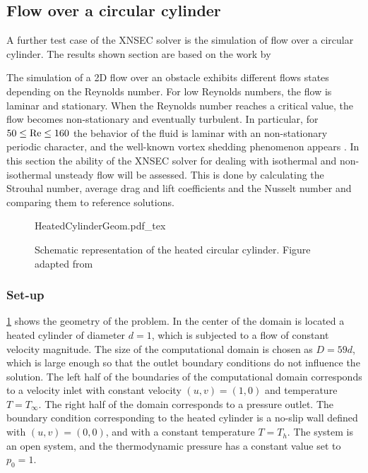\subsection{Flow over a circular cylinder}\label{ssec:FlowCircCyl}

A further test case of the XNSEC solver is the simulation of flow over a circular cylinder. The results shown section are based on the work by \textcite{miaoHighOrderSimulationLowMachFlows2022}

The simulation of a 2D flow over an obstacle exhibits different flows states depending on the Reynolds number. For low Reynolds numbers, the flow is laminar and stationary. When the Reynolds number reaches a critical value, the flow becomes non-stationary and eventually turbulent. In particular, for $50 \leq \text{Re} \leq 160$ the behavior of the fluid is laminar with an non-stationary periodic character, and the well-known vortex shedding phenomenon appears \parencite{sharmaHeatFluidFlow2004}. In this section the ability of the XNSEC solver for dealing with isothermal and non-isothermal unsteady flow will be assessed. 
This is done by calculating the Strouhal number, average drag and lift coefficients and the Nusselt number and comparing them to reference solutions.
\begin{figure}[t!]
	\begin{center}
		\def\svgwidth{0.88\textwidth}
		{HeatedCylinderGeom.pdf_tex}
		\caption{Schematic representation of the heated circular cylinder. Figure adapted from \parencite{miaoHighOrderSimulationLowMachFlows2022}} 
		\label{fig:CircularCylinderGeom}%
	\end{center}%
\end{figure}%
\subsubsection{Set-up}
\cref{fig:CircularCylinderGeom} shows the geometry of the problem. In the center of the domain is located a heated cylinder of diameter $d = 1$, which is subjected to a flow of constant velocity magnitude. The size of the computational domain is chosen as $D = 59d$, which is large enough so that the outlet boundary conditions do not influence the solution. The left half of the boundaries of the computational domain corresponds to a velocity inlet with constant velocity $(u,v) = (1,0)$ and temperature $T = T_\infty$. The right half of the domain corresponds to a pressure outlet. The boundary condition corresponding to the heated cylinder is a no-slip wall defined with $(u,v) = (0,0)$, and with a constant temperature $T = T_h$. The system is an open system, and the thermodynamic pressure has a constant value set to $p_0 = 1$.

